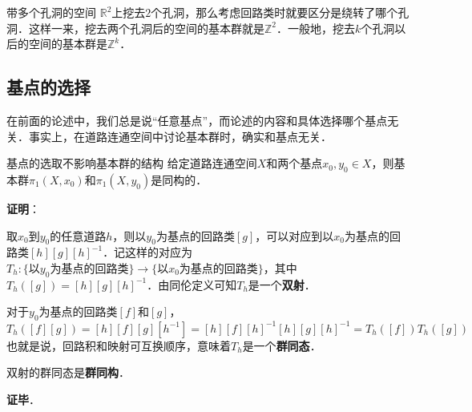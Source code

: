 \begin{example}{带多个孔洞的空间}
$\mathbb{R}^2$上挖去$2$个孔洞，那么考虑回路类时就要区分是绕转了哪个孔洞．这样一来，挖去两个孔洞后的空间的基本群就是$\mathbb{Z}^2$．一般地，挖去$k$个孔洞以后的空间的基本群是$\mathbb{Z}^k$．
\end{example}

\subsection{基点的选择}

在前面的论述中，我们总是说“任意基点”，而论述的内容和具体选择哪个基点无关．事实上，在道路连通空间中讨论基本群时，确实和基点无关．

\begin{theorem}{基点的选取不影响基本群的结构}
给定道路连通空间$X$和两个基点$x_0, y_0\in X$，则基本群$\pi_1(X, x_0)$和$\pi_1(X, y_0)$是同构的．
\end{theorem}

\textbf{证明}：

取$x_0$到$y_0$的任意道路$h$，则以$y_0$为基点的回路类$[g]$，可以对应到以$x_0$为基点的回路类$[h][g][h]^{-1}$．记这样的对应为$T_h: \{以y_0为基点的回路类\}\rightarrow\{以x_0为基点的回路类\}$，其中$T_h([g])=[h][g][h]^{-1}$．由同伦定义可知$T_h$是一个\textbf{双射}．

对于$y_0$为基点的回路类$[f]$和$[g]$，$$T_h([f][g])=[h][f][g][h^{-1}]=[h][f][h]^{-1}[h][g][h]^{-1}=T_h([f])T_h([g])$$
也就是说，回路积和映射可互换顺序，意味着$T_h$是一个\textbf{群同态}．

双射的群同态是\textbf{群同构}．

\textbf{证毕}．



